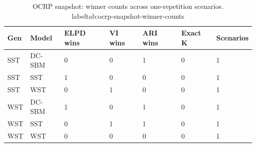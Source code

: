 \begin{table}[!h]
\centering
\caption{OCRP snapshot: winner counts across one-repetition scenarios.\\label{tab:ocrp-snapshot-winner-counts}}
\centering
\begin{tabular}[t]{lllllll}
\toprule
Gen & Model & ELPD wins & VI wins & ARI wins & Exact K & Scenarios\\
\midrule
SST & DC-SBM & 0 & 0 & 1 & 0 & 1\\
SST & SST & 1 & 0 & 0 & 0 & 1\\
SST & WST & 0 & 1 & 0 & 0 & 1\\
WST & DC-SBM & 1 & 0 & 1 & 0 & 1\\
WST & SST & 0 & 1 & 1 & 0 & 1\\
WST & WST & 0 & 0 & 0 & 0 & 1\\
\bottomrule
\end{tabular}
\end{table}

